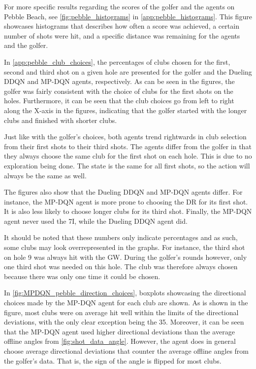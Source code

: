 \documentclass{kththesis}
\begin{document}
For more specific results regarding the scores of the golfer and the agents on Pebble Beach, see \autoref{fig:pebble_histograms} in \autoref{app:pebble_histograms}. This figure showcases histograms that describes how often a score was achieved, a certain number of shots were hit, and a specific distance was remaining for the agents and the golfer.

In \autoref{app:pebble_club_choices}, the percentages of clubs chosen for the first, second and third shot on a given hole are presented for the golfer and the Dueling DDQN and MP-DQN agents, respectively. As can be seen in the figures, the golfer was fairly consistent with the choice of clubs for the first shots on the holes. Furthermore, it can be seen that the club choices go from left to right along the X-axis in the figures, indicating that the golfer started with the longer clubs and finished with shorter clubs.

Just like with the golfer's choices, both agents trend rightwards in club selection from their first shots to their third shots. The agents differ from the golfer in that they always choose the same club for the first shot on each hole. This is due to no exploration being done. The state is the same for all first shots, so the action will always be the same as well.

The figures also show that the Dueling DDQN and MP-DQN agents differ. For instance, the MP-DQN agent is more prone to choosing the DR for its first shot. It is also less likely to choose longer clubs for its third shot. Finally, the MP-DQN agent never used the 7I, while the Dueling DDQN agent did.

It should be noted that these numbers only indicate percentages and as such, some clubs may look overrepresented in the graphs. For instance, the third shot on hole 9 was always hit with the GW. During the golfer's rounds however, only one third shot was needed on this hole. The club was therefore always chosen because there was only one time it could be chosen.

In \autoref{fig:MPDQN_pebble_direction_choices}, boxplots showcasing the directional choices made by the MP-DQN agent for each club are shown. As is shown in the figure, most clubs were on average hit well within the limits of the directional deviations, with the only clear exception being the 35. Moreover, it can be seen that the MP-DQN agent used higher directional deviations than the average offline angles from \autoref{fig:shot_data_angle}. However, the agent does in general choose average directional deviations that counter the average offline angles from the golfer's data. That is, the sign of the angle is flipped for most clubs.
\end{document}
